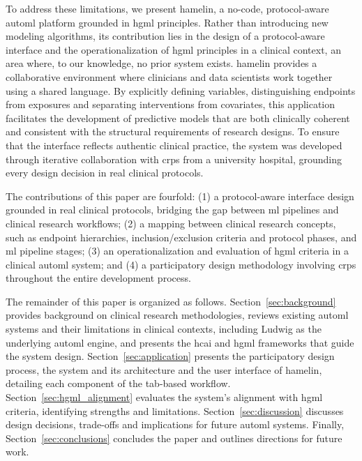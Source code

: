 \documentclass[conference,twocolumn]{IEEEtran}
\begin{document}
To address these limitations, we present \gls{hamelin}, a no-code, protocol-aware 
\gls{automl} platform grounded in \gls{hgml} principles. Rather than introducing new modeling algorithms, its contribution lies in the design of a protocol-aware interface and the operationalization of \gls{hgml} principles in a clinical context, an area where, to our knowledge, no prior system exists. \gls{hamelin} provides a collaborative environment where clinicians and data scientists work together using a shared language. By explicitly defining variables, distinguishing endpoints from exposures and separating interventions from covariates, this application facilitates the development of predictive models that are both clinically coherent and consistent with the structural requirements of research designs. To ensure that the interface reflects authentic clinical practice, the system was developed through iterative collaboration with \glspl{crp} from a university hospital, grounding every design decision in real clinical protocols.

The contributions of this paper are fourfold: (1) a protocol-aware interface design grounded in real clinical protocols, bridging the gap between \gls{ml} pipelines and clinical research workflows; (2) a mapping between clinical research concepts, such as endpoint hierarchies, inclusion/exclusion criteria and protocol phases, and \gls{ml} pipeline stages; (3) an operationalization and evaluation of \gls{hgml} 
criteria in a clinical \gls{automl} system; and (4) a participatory design methodology involving \glspl{crp} throughout the entire development process.

The remainder of this paper is organized as follows. Section~\ref{sec:background} provides background on clinical research methodologies, reviews existing \gls{automl} systems and their limitations in clinical contexts, including Ludwig as the underlying \gls{automl} engine, and presents the \gls{hcai} and \gls{hgml} frameworks that guide the system design. Section~\ref{sec:application} presents the participatory design process, the system and its architecture and the user interface of \gls{hamelin}, detailing each component of the tab-based workflow. Section~\ref{sec:hgml_alignment} evaluates the system's alignment with \gls{hgml} criteria, identifying strengths and limitations. Section~\ref{sec:discussion} discusses design decisions, trade-offs and implications for future \gls{automl} systems. Finally, Section~\ref{sec:conclusions} concludes the paper and outlines directions for future work.
\end{document}
